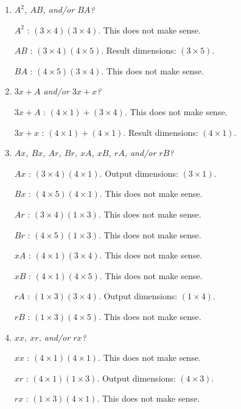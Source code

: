 \documentclass{article}
\begin{document}
\begin{enumerate}
    \item \textit{$ A^2 $, $ AB $, and/or $ BA $?}

        $ A^2 $ : $ (3 \times 4) (3 \times 4) $. This does not make sense.

        $ AB $ : $ (3 \times 4) (4 \times 5) $. Result dimensions: $ (3 \times
        5) $.

        $ BA $ : $ (4 \times 5) (3 \times 4) $. This does not make sense.

    \item \textit{$ 3x + A $ and/or $ 3x + x $?}

        $ 3x + A $ : $ (4 \times 1) + (3 \times 4) $. This does not make sense.

        $ 3x + x $ : $ (4 \times 1) + (4 \times 1) $. Result dimensions: $ (4
        \times 1) $.

    \item \textit{$ Ax $, $ Bx $, $ Ar $, $ Br $, $ xA $, $ xB $, $ rA $, and/or
        $ rB $?}

        $ Ax $ : $ (3 \times 4) (4 \times 1) $. Output dimensions: $ (3 \times
        1) $.

        $ Bx $ : $ (4 \times 5) (4 \times 1) $. This does not make sense.

        $ Ar $ : $ (3 \times 4) (1 \times 3) $. This does not make sense.

        $ Br $ : $ (4 \times 5) (1 \times 3) $. This does not make sense.

        $ xA $ : $ (4 \times 1) (3 \times 4) $. This does not make sense.

        $ xB $ : $ (4 \times 1) (4 \times 5) $. This does not make sense.

        $ rA $ : $ (1 \times 3) (3 \times 4) $. Output dimensions: $ (1 \times
        4) $.

        $ rB $ : $ (1 \times 3) (4 \times 5) $. This does not make sense.

    \item \textit{$ xx $, $ xr $, and/or $ rx $?}

        $ xx $ : $ (4 \times 1) (4 \times 1) $. This does not make sense.

        $ xr $ : $ (4 \times 1) (1 \times 3) $. Output dimensions: $ (4 \times
        3) $.

        $ rx $ : $ (1 \times 3) (4 \times 1) $. This does not make sense.
\end{enumerate}
\end{document}
